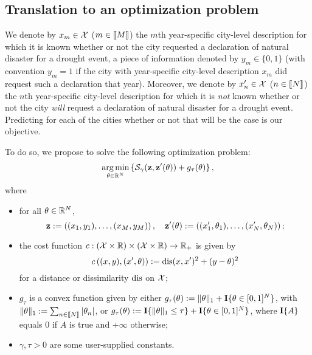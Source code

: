 \subsection{Translation to an optimization problem}
\label{subsec:opt:pbm}

We denote  by $x_{m}  \in\mathcal{X}$ ($m  \in \llbracket M  \rrbracket$) the  $m$th year-specific
city-level description for which it is known whether or not the city requested
a declaration of natural disaster for  a drought event, a piece of information
denoted  by $y_{m}  \in\{0,1\}$ (with  convention $y_{m}=1$  if the  city with
year-specific city-level  description $x_{m}$  did request such  a declaration
that year).  Moreover, we denote by $x_{n}'\in  \mathcal{X}$ ($n \in \llbracket N \rrbracket$) the
$n$th year-specific city-level description for  which it is \textit{not} known
whether  or  not the  city  \textit{will}  request  a declaration  of  natural
disaster for  a drought event.  Predicting  for each of the  cities whether or
not that will be the case is our objective.


To do so, we propose to solve the following optimization problem:
\begin{equation}
  \label{eq:main:pbm}
  \mathop{\arg\min}_{\theta    \in     \mathbb{R}^{N}}    \left\{\mathcal{S}_{\gamma}(\textbf{z},
    \textbf{z}'(\theta)) + g_{\tau}(\theta) \right\}, 
\end{equation}
where
\begin{itemize}
\item for all $\theta \in \mathbb{R}^{N}$,
  \begin{equation*}   \textbf{z}    :=   \left((x_{1},   y_{1}),    \ldots,   (x_{M},
      y_{M})\right), \quad \textbf{z}'(\theta) := \left((x_{1}', \theta_{1}), \ldots,
      (x_{N}', \theta_{N})\right);
  \end{equation*}
\item                   the                    cost                   function
  $c : (\mathcal{X} \times \mathbb{R})\times (\mathcal{X} \times \mathbb{R})\to \mathbb{R}_{+}$ is given by
  \begin{equation*}
    c\left((x,y), (x', \theta)\right) := \operatorname{dis}(x,x')^{2} + (y - \theta)^{2} 
  \end{equation*}
  for a distance or dissimilarity $\operatorname{dis}$ on $\mathcal{X}$;
\item    $g_{\tau}$    is    a     convex    function    given    by    either
  $g_{\tau}(\theta)  := \|\theta\|_{1}  + \textbf{I}\{\theta  \in [0,1]^{N}\}$,  with
  $\|\theta\|_{1}:=    \sum_{n   \in    \llbracket   N    \rrbracket}   |\theta_{n}|$,    or
  $g_{\tau}(\theta)  :=  \textbf{I}\{\|\theta\|_{1}  \leq \tau\}  +  \textbf{I}\{\theta  \in
  [0,1]^{N}\}$,  where  $\textbf{I}\{A\}$ equals  0  if  $A$  is true  and  $+\infty$
  otherwise;
\item $\gamma, \tau > 0$ are some user-supplied constants.
\end{itemize}
 

